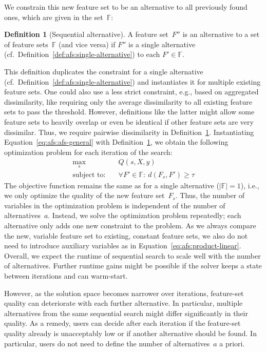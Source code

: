 \documentclass{article}
\theoremstyle{definition}
\newtheorem{definition}[proposition]{Definition} %
\begin{document}
We constrain this new feature set to be an alternative to all previously found ones, which are given in the set~$\mathbb{F}$:
%
\begin{definition}[Sequential alternative]
	A feature set~$F''$ is an alternative to a set of feature sets~$\mathbb{F}$ (and vice versa) if $F''$ is a single alternative (cf.~Definition~\ref{def:afs:single-alternative}) to each $F' \in \mathbb{F}$.
	\label{def:afs:sequential-alternative}
\end{definition}
%
This definition duplicates the constraint for a single alternative (cf.~Definition~\ref{def:afs:single-alternative}) and instantiates it for multiple existing feature sets.
One could also use a less strict constraint, e.g., based on aggregated dissimilarity, like requiring only the average dissimilarity to all existing feature sets to pass the threshold.
However, definitions like the latter might allow some feature sets to heavily overlap or even be identical if other feature sets are very dissimilar.
Thus, we require pairwise dissimilarity in Definition~\ref{def:afs:sequential-alternative}.
Instantiating Equation~\ref{eq:afs:afs-general} with Definition~\ref{def:afs:sequential-alternative}, we obtain the following optimization problem for each iteration of the search:
%
\begin{equation}
	\begin{aligned}
		\max_s &\quad Q(s,X,y) \\
		\text{subject to:} &\quad \forall F' \in \mathbb{F}:~d(F_s,F') \geq \tau
	\end{aligned}
	\label{eq:afs:afs-sequential}
\end{equation}
%
The objective function remains the same as for a single alternative ($|\mathbb{F}| = 1$), i.e., we only optimize the quality of the new feature set~$F_s$.
Thus, the number of variables in the optimization problem is independent of the number of alternatives~$a$.
Instead, we solve the optimization problem repeatedly; each alternative only adds one new constraint to the problem.
As we always compare the new, variable feature set to existing, constant feature sets, we also do not need to introduce auxiliary variables as in Equation~\ref{eq:afs:product-linear}.
Overall, we expect the runtime of sequential search to scale well with the number of alternatives.
Further runtime gains might be possible if the solver keeps a state between iterations and can warm-start.

However, as the solution space becomes narrower over iterations, feature-set quality can deteriorate with each further alternative.
In particular, multiple alternatives from the same sequential search might differ significantly in their quality.
As a remedy, users can decide after each iteration if the feature-set quality already is unacceptably low or if another alternative should be found.
In particular, users do not need to define the number of alternatives~$a$ a priori.
\end{document}

